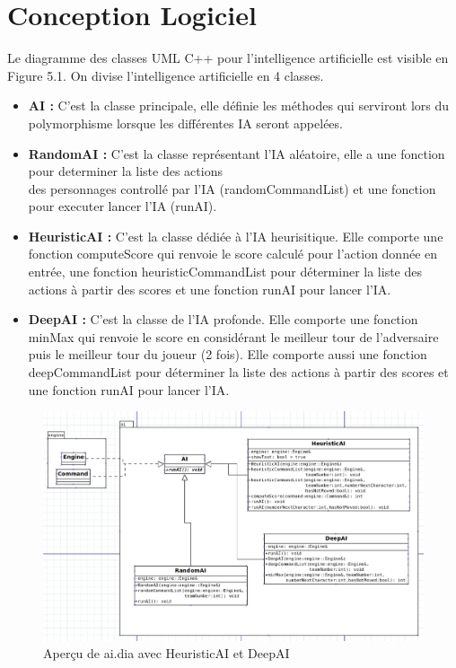 \section{Conception Logiciel}
Le diagramme des classes UML C++ pour l'intelligence artificielle est
visible en Figure 5.1.
On divise l'intelligence artificielle en 4 classes.
\\
\begin{itemize}

\item \textbf{AI :} C'est la classe principale, elle définie les 
méthodes qui serviront lors du polymorphisme lorsque les 
différentes IA seront appelées.
\\
\item \textbf{RandomAI :} C'est la classe représentant l'IA 
aléatoire, elle a une fonction pour determiner la liste des actions \\
des personnages controllé par l'IA (randomCommandList) et une 
fonction pour executer lancer l'IA (runAI).
\\
\item \textbf{HeuristicAI :} C'est la classe dédiée à l'IA heurisitique.
Elle comporte une fonction computeScore qui renvoie le score calculé
pour l'action donnée en entrée, une fonction heuristicCommandList pour
déterminer la liste des actions à partir des scores et une fonction
runAI pour lancer l'IA.
\\
\item \textbf{DeepAI :} C'est la classe de l'IA profonde. Elle comporte 
une fonction minMax qui renvoie le score en considérant le meilleur tour
de l'adversaire puis le meilleur tour du joueur (2 fois). Elle comporte 
aussi une fonction deepCommandList pour déterminer la liste des actions 
à partir des scores et une fonction runAI pour lancer l'IA. 

\end{itemize}


\begin{figure}[H]
\includegraphics[width=\linewidth]{images/deep_ai_dia.png}
\centering
\caption{Aperçu de ai.dia avec HeuristicAI et DeepAI}
\label{fig:img3}
\end{figure}
\newpage
